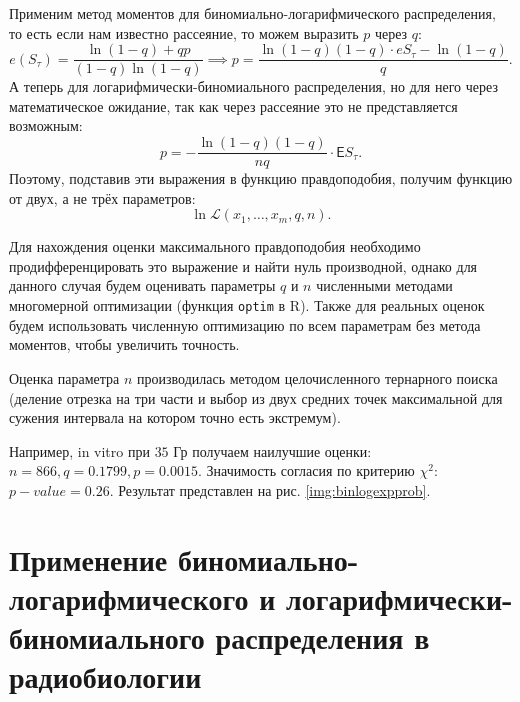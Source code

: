 \documentclass[12pt, specialist, subf, substylefile = spbu_report.rtx]{disser}
\begin{document}
	Применим метод моментов для биномиально-логарифмического распределения, то есть если нам известно рассеяние, то можем выразить $ p $ через $ q $:
	\[
		e (S _\tau)=\frac{\ln(1 - q) + q p}{(1-q)\ln(1 - q)} \implies p = \frac {\ln(1 - q) (1 - q) \cdot eS _\tau - \ln(1 - q)} {q}.
	\]
	А теперь для логарифмически-биномиального распределения, но для него через математическое ожидание, так как через рассеяние это не представляется возможным:
	\[
		p = -\frac {\ln(1 - q)(1 - q)} {nq} \cdot \mathsf{E} S _\tau.
	\]
	Поэтому, подставив эти выражения в функцию правдоподобия, получим функцию от двух, а не трёх параметров:
	\[
		\ln \mathcal{L} (x _1, \dots, x _m, q, n).
	\]
	
	Для нахождения оценки максимального правдоподобия необходимо продифференцировать это выражение и найти нуль производной, однако для данного случая будем оценивать параметры $ q $ и $ n $ численными методами многомерной оптимизации (функция \verb|optim| в R). Также для реальных оценок будем использовать численную оптимизацию по всем параметрам без метода моментов, чтобы увеличить точность.
	
	Оценка параметра $n$ производилась методом целочисленного тернарного поиска (деление отрезка на три части и выбор из двух средних точек максимальной для сужения интервала на котором точно есть экстремум).
	
	Например, in vitro при $ 35 $ Гр получаем наилучшие оценки: $ n = 866, q = 0.1799, p = 0.0015$. Значимость согласия по критерию $ \chi ^2 $: $ p-value = 0.26 $. Результат представлен на рис. \ref{img:binlogexpprob}.
	
	\section{Применение биномиально-логарифмического и логарифмически-биномиального распределения в радиобиологии}
	
	\label{radiobiology}
	
\end{document}
